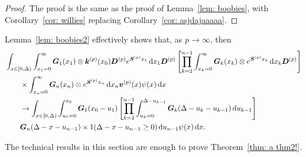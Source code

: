 \begin{proof} 
	The proof is the same as the proof of Lemma~\ref{lem: boobies}, with Corollary~\ref{cor: willies} replacing Corollary~\ref{cor: asjdajaaaaa}.
\end{proof}
Lemma~\ref{lem: boobies2} effectively shows that, as \(p \to \infty\), then 
\begin{align}
	&\int_{x\in[0,\Delta)} \int_{x_1=0}^\infty \bs G_1(x_1) \otimes \bs k^{(p)} (x_0) \bs D^{(p)} e^{\bs{S}^{(p)}x_1}\wrt x_1\bs D^{(p)} 
			\left[\prod_{k=2}^{n-1}\int_{x_k=0}^\infty \bs G_{k}(x_k) \otimes e^{\bs{S}^{(p)}x_k} \wrt x_k
	\bs D^{(p)} \right] \nonumber 
			\\&\qquad{}\times\int_{x_n=0}^\infty \bs G_{n}(x_n) \otimes e^{\bs{S}^{(p)}x_n} \wrt x_n {\bs v}^{(p)}(x) \psi(x)\wrt x \nonumber 
%
	\\&\qquad {}\to \int_{x\in[0,\Delta)} \int_{u_1=0}^{x_0}\bs G_1(x_0 - u_1)
	\left[\prod_{k=2}^{n-1} \int_{u_k=0}^{\Delta-u_{k-1}} \bs {G}_{k}(\Delta-u_k-u_{k-1})\wrt u_{k-1}\right] \nonumber 
			\\&\qquad{} \bs G_{n}(\Delta - x-u_{n-1})
		 \times1(\Delta-x-u_{n-1}\geq0)\wrt u_{n-1}\psi(x)\wrt x.  \nonumber
\end{align}

The technical results in this section are enough to prove Theorem~\ref{thm: a thm2!}.

